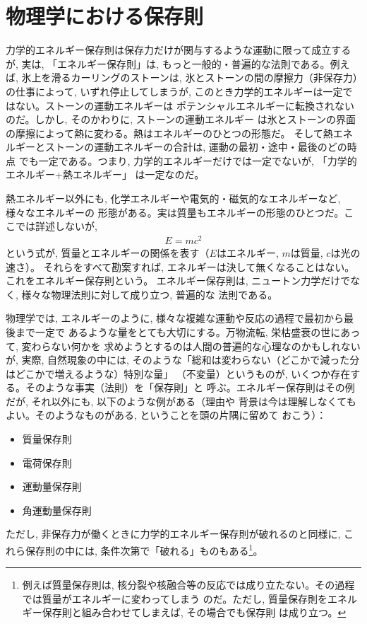 \vspace{0.4cm}


\section{物理学における保存則}

力学的エネルギー保存則は保存力だけが関与するような運動に限って成立するが, 実は, 
「エネルギー保存則」は, もっと一般的・普遍的な法則である。例えば, 
氷上を滑るカーリングのストーンは, 氷とストーンの間の摩擦力（非保存力）の仕事によって, 
いずれ停止してしまうが, このとき力学的エネルギーは一定ではない。ストーンの運動エネルギーは
ポテンシャルエネルギーに転換されないのだ。しかし, そのかわりに, ストーンの運動エネルギー
は氷とストーンの界面の摩擦によって熱に変わる。熱はエネルギーのひとつの形態だ。
そして熱エネルギーとストーンの運動エネルギーの合計は, 運動の最初・途中・最後のどの時点
でも一定である。つまり, 力学的エネルギーだけでは一定でないが, 「力学的エネルギー+熱エネルギー」
は一定なのだ。

熱エネルギー以外にも, 化学エネルギーや電気的・磁気的なエネルギーなど, 様々なエネルギーの
形態がある。実は質量もエネルギーの形態のひとつだ。ここでは詳述しないが, 
\begin{eqnarray}E=mc^2\end{eqnarray}
という式が, 質量とエネルギーの関係を表す（$E$はエネルギー, $m$は質量, $c$は光の速さ）。
それらをすべて勘案すれば, エネルギーは決して無くなることはない。これをエネルギー保存則という。
エネルギー保存則は, ニュートン力学だけでなく, 様々な物理法則に対して成り立つ, 普遍的な
法則である。

物理学では, エネルギーのように, 様々な複雑な運動や反応の過程で最初から最後まで一定で
あるような量をとても大切にする。万物流転, 栄枯盛衰の世にあって, 変わらない何かを
求めようとするのは人間の普遍的な心理なのかもしれないが, 実際, 自然現象の中には, 
そのような「総和は変わらない（どこかで減った分はどこかで増えるような）特別な量」
（不変量）というものが, いくつか存在する。そのような事実（法則）を「保存則」と
呼ぶ。エネルギー保存則はその例だが, それ以外にも, 以下のような例がある（理由や
背景は今は理解しなくてもよい。そのようなものがある, ということを頭の片隅に留めて
おこう）：
\begin{itemize}
\item 質量保存則
\item 電荷保存則
\item 運動量保存則
\item 角運動量保存則
\end{itemize}
ただし, 非保存力が働くときに力学的エネルギー保存則が破れるのと同様に, 
これら保存則の中には, 条件次第で「破れる」ものもある\footnote{例えば質量保存則は, 
核分裂や核融合等の反応では成り立たない。その過程では質量がエネルギーに変わってしまう
のだ。ただし, 質量保存則をエネルギー保存則と組み合わせてしまえば, その場合でも保存則
は成り立つ。}。

